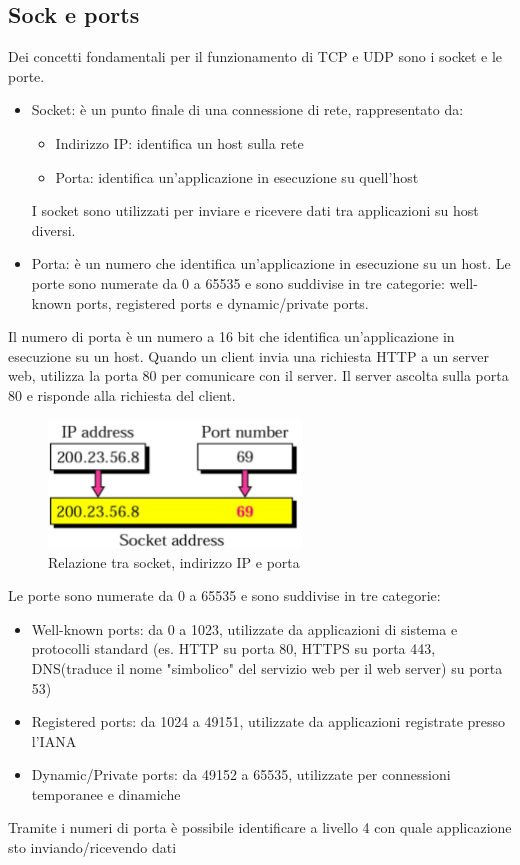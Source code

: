\subsection{Sock e ports}
Dei concetti fondamentali per il funzionamento di TCP e UDP sono i socket e le porte.
\begin{itemize}
    \item Socket: è un punto finale di una connessione di rete, rappresentato da:
    \begin{itemize}
        \item Indirizzo IP: identifica un host sulla rete
        \item Porta: identifica un'applicazione in esecuzione su quell'host 
    \end{itemize}
    I socket sono utilizzati per inviare e ricevere dati tra applicazioni su host diversi.
    \item Porta: è un numero che identifica un'applicazione in esecuzione su un host. Le porte sono numerate da 0 a 65535 e sono suddivise in tre categorie: well-known ports, registered ports e dynamic/private ports.
\end{itemize}
Il numero di porta è un numero a 16 bit che identifica un'applicazione in esecuzione su un host. Quando un client invia una richiesta HTTP a un server web, utilizza la porta 80 per comunicare con il server. Il server ascolta sulla porta 80 e risponde alla richiesta del client.

\begin{figure}[h!]
    \centering
    \includegraphics[width=0.6\textwidth]{images/socket_port.png}
    \caption{Relazione tra socket, indirizzo IP e porta}
    \label{fig:socket_port}
\end{figure}

Le porte sono numerate da 0 a 65535 e sono suddivise in tre categorie:
\begin{itemize}
    \item Well-known ports: da 0 a 1023, utilizzate da applicazioni di sistema e protocolli standard (es. HTTP su porta 80, HTTPS su porta 443, DNS(traduce il nome "simbolico" del servizio web per il web server) su porta 53)
    \item Registered ports: da 1024 a 49151, utilizzate da applicazioni registrate presso l'IANA
    \item Dynamic/Private ports: da 49152 a 65535, utilizzate per connessioni temporanee e dinamiche
\end{itemize}
\newpage
Tramite i numeri di porta è possibile identificare a livello 4 con quale applicazione sto inviando/ricevendo dati

